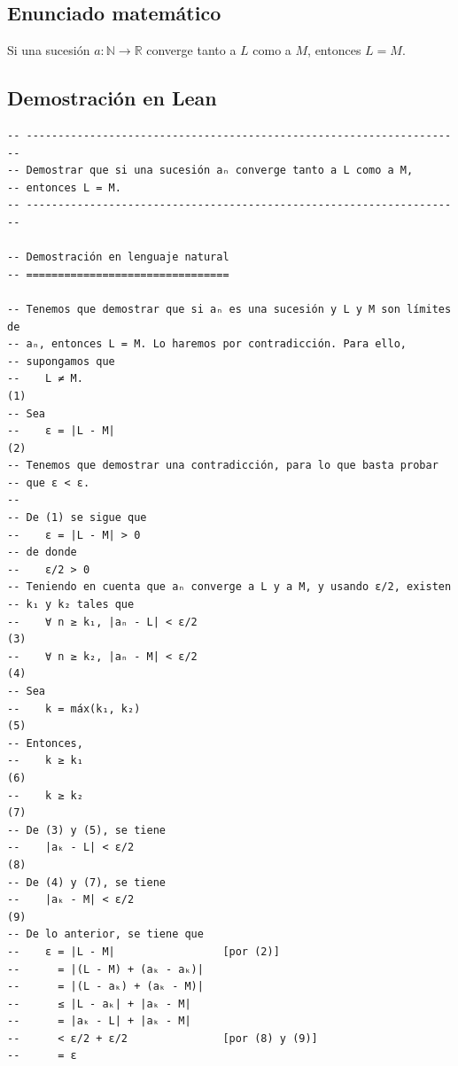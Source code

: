 \subsection{Enunciado matemático}

\begin{theorem}
Si una sucesión $a : \mathbb{N} \to \mathbb{R}$ converge tanto a $L$ como a
$M$, entonces $L = M$.
\end{theorem}

\subsection{Demostración en Lean}

\begin{verbatim}
-- ---------------------------------------------------------------------
-- Demostrar que si una sucesión aₙ converge tanto a L como a M,
-- entonces L = M.
-- ---------------------------------------------------------------------

-- Demostración en lenguaje natural
-- ================================

-- Tenemos que demostrar que si aₙ es una sucesión y L y M son límites de
-- aₙ, entonces L = M. Lo haremos por contradicción. Para ello,
-- supongamos que
--    L ≠ M.                                                         (1)
-- Sea
--    ε = |L - M|                                                    (2)
-- Tenemos que demostrar una contradicción, para lo que basta probar
-- que ε < ε.
--
-- De (1) se sigue que
--    ε = |L - M| > 0
-- de donde
--    ε/2 > 0
-- Teniendo en cuenta que aₙ converge a L y a M, y usando ε/2, existen
-- k₁ y k₂ tales que
--    ∀ n ≥ k₁, |aₙ - L| < ε/2                                       (3)
--    ∀ n ≥ k₂, |aₙ - M| < ε/2                                       (4)
-- Sea
--    k = máx(k₁, k₂)                                                (5)
-- Entonces,
--    k ≥ k₁                                                         (6)
--    k ≥ k₂                                                         (7)
-- De (3) y (5), se tiene
--    |aₖ - L| < ε/2                                                 (8)
-- De (4) y (7), se tiene
--    |aₖ - M| < ε/2                                                 (9)
-- De lo anterior, se tiene que
--    ε = |L - M|                 [por (2)]
--      = |(L - M) + (aₖ - aₖ)|
--      = |(L - aₖ) + (aₖ - M)|
--      ≤ |L - aₖ| + |aₖ - M|
--      = |aₖ - L| + |aₖ - M|
--      < ε/2 + ε/2               [por (8) y (9)]
--      = ε


\end{verbatim}
